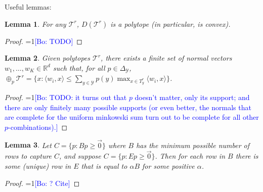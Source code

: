 \documentclass[12pt]{article}
\newcommand{\Comments}{1}
\newcommand{\mynote}[2]{\ifnum\Comments=1\textcolor{#1}{#2}\fi}
\newcommand{\bo}[1]{\mynote{blue}{[Bo: #1]}}
\newcommand{\reals}{\mathbb{R}}
\newcommand{\simplex}{\Delta_\Y}
\newcommand{\T}{\mathcal{T}}
\newcommand{\Y}{\mathcal{Y}}
\newcommand{\inprod}[2]{\langle #1, #2 \rangle}%
\newtheorem{lemma}{Lemma}
\begin{document}
  Useful lemmas:
  \begin{lemma} \label{lemma:D-polytope}
    For any $\T^r$, $D(\T^r)$ is a polytope (in particular, is convex).
  \end{lemma}
  \begin{proof}
    \bo{TODO}
  \end{proof}
  \begin{lemma}  \label{lemma:minkowski-support}
    Given polytopes $\T^r$, there exists a finite set of normal vectors $w_1,\ldots,w_K \in \reals^d$ such that, for all $p \in \simplex$, $\oplus_p \T^r = \{x : \inprod{w_i}{x} \leq \sum_{y \in \Y} p(y) \max_{x \in T^r_y} \inprod{w_i}{x} \}$.
  \end{lemma}
  \begin{proof}
%
    \bo{TODO: it turns out that $p$ doesn't matter, only its support; and there are only finitely many possible supports (or even better, the normals that are complete for the uniform minkowski sum turn out to be complete for all other $p$-combinations).}
  \end{proof}
  \begin{lemma} \label{lemma:E-to-B}
    Let $C = \{p : Bp \geq \vec 0 \}$ where $B$ has the minimum possible number of rows to capture $C$, and suppose $C = \{p : Ep \geq \vec 0 \}$.
    Then for each row in $B$ there is some (unique) row in $E$ that is equal to $\alpha B$ for some positive $\alpha$.
  \end{lemma}
  \begin{proof}
    \bo{? Cite}
  \end{proof}
\end{document}
